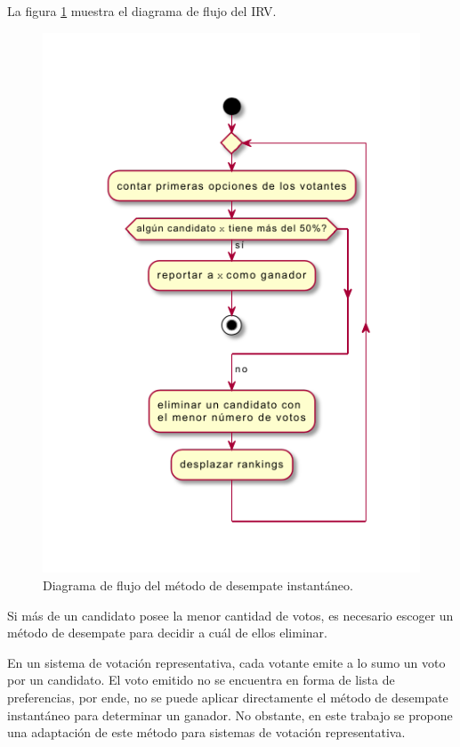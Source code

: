 La figura \ref{fig:irv} muestra el diagrama de flujo del IRV.

\begin{figure}[!h]
    \centering
    \includegraphics[scale=1.4]{Graphics/irv.pdf}
    \caption{Diagrama de flujo del m\'etodo de desempate instant\'aneo.}
    \label{fig:irv}
\end{figure}

Si m\'as de un candidato posee la menor cantidad de votos, es necesario escoger un m\'etodo de desempate para decidir a cu\'al de ellos eliminar.


En un sistema de votaci\'on representativa, cada votante emite a lo sumo un voto por un candidato. El voto emitido no se encuentra en forma de lista de preferencias, por ende, no se puede aplicar directamente el m\'etodo de desempate instant\'aneo para determinar un ganador. No obstante, en  este trabajo se propone una adaptaci\'on de este m\'etodo para sistemas de votaci\'on representativa.